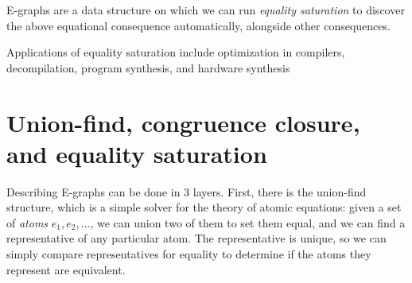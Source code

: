 \documentclass[12pt,a4paper,twoside,openright]{report}
\numberwithin{equation}{chapter}		%
\numberwithin{figure}{chapter}			%
\numberwithin{table}{chapter}			%
\theoremstyle{definition}
\theoremstyle{plain}
\begin{document}
E-graphs are a data structure on which we can run \emph{equality saturation} to discover the above equational consequence automatically, alongside other consequences.

Applications of equality saturation include optimization in compilers, decompilation, program synthesis, and hardware synthesis \cite{willsey_egg_2021, frankel_syntax-guided_2025, xiao_skyegg_2025}

\section{Union-find, congruence closure, and equality saturation}
\begin{figure}[ht!]
	\centering
\end{figure}

Describing E-graphs can be done in 3 layers. First, there is the union-find structure, which is a simple solver for the theory of atomic equations: given a set of \emph{atoms} $e_1, e_2, \ldots$, we can union two of them to set them equal, and we can find a representative of any particular atom. The representative is unique, so we can simply compare representatives for equality to determine if the atoms they represent are equivalent.
\end{document}
